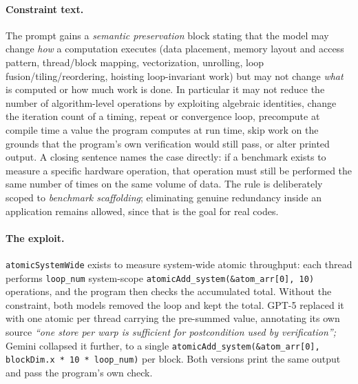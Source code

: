 \paragraph{Constraint text.}
The prompt gains a \emph{semantic preservation} block stating that the model may change \emph{how} a
computation executes (data placement, memory layout and access pattern, thread/block mapping,
vectorization, unrolling, loop fusion/tiling/reordering, hoisting loop-invariant work) but may not
change \emph{what} is computed or how much work is done. In particular it may not reduce the number of
algorithm-level operations by exploiting algebraic identities, change the iteration count of a timing,
repeat or convergence loop, precompute at compile time a value the program computes at run time, skip
work on the grounds that the program's own verification would still pass, or alter printed output. A
closing sentence names the case directly: if a benchmark exists to measure a specific hardware
operation, that operation must still be performed the same number of times on the same volume of data.
The rule is deliberately scoped to \emph{benchmark scaffolding}; eliminating genuine redundancy inside
an application remains allowed, since that is the goal for real codes.

\paragraph{The exploit.}
\texttt{atomicSystemWide} exists to measure system-wide atomic throughput: each thread performs
\texttt{loop\_num} system-scope \texttt{atomicAdd\_system(\&atom\_arr[0],\,10)} operations, and the
program then checks the accumulated total. Without the constraint, both models removed the loop and
kept the total. GPT-5 replaced it with one atomic per thread carrying the pre-summed value, annotating
its own source \textit{``one store per warp is sufficient for postcondition used by verification'';}
Gemini collapsed it further, to a single \texttt{atomicAdd\_system(\&atom\_arr[0], blockDim.x * 10 *
loop\_num)} per block. Both versions print the same output and pass the program's own check.

